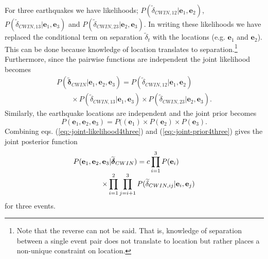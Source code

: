 \documentclass[extra]{gji}
\begin{document}
For three earthquakes we have likelihoods;
$P(\widetilde{\delta}_{CWIN,12}|\mathbf{e}_1, \mathbf{e}_2)$,
$P(\widetilde{\delta}_{CWIN,13}|\mathbf{e}_1, \mathbf{e}_3)$
and
$P(\widetilde{\delta}_{CWIN,23}|\mathbf{e}_2, \mathbf{e}_3)$.
In writing
these likelihoods we have replaced the conditional term on separation
$\widetilde{\delta}_t$ with the locations (e.g. $\mathbf{e}_1$ and $\mathbf{e}_2$).
This can be done because
knowledge of location translates to separation.\footnote{Note that the reverse
can not be said. That is, knowledge of separation between a single event pair
does not translate to location but rather places a non-unique constraint on
location.}
Furthermore, since the pairwise functions are independent the joint
likelihood becomes
\begin{equation}
\begin{array}{l}
\label{eq:-joint-likelihood4three}
P(\widetilde{\mathbf{\delta}}_{CWIN} | \mathbf{e}_1, \mathbf{e}_2, \mathbf{e}_3) =
P(\widetilde{\delta}_{CWIN,12} | \mathbf{e}_1, \mathbf{e}_2) \\
\hspace{2em} \times P(\widetilde{\delta}_{CWIN,13} | \mathbf{e}_1, \mathbf{e}_3)
\times  P(\widetilde{\delta}_{CWIN,23} | \mathbf{e}_2, \mathbf{e}_3).
\end{array}
\end{equation}
Similarly, the earthquake locations are independent and the
joint prior becomes
\begin{equation}
\label{eq:-joint-prior4three}
P(\mathbf{e}_1, \mathbf{e}_2, \mathbf{e}_3) = P((\mathbf{e}_1) \times P(\mathbf{e}_2) \times P(\mathbf{e}_3).
\end{equation}
Combining eqs. (\ref{eq:-joint-likelihood4three}) and (\ref{eq:-joint-prior4three})
gives the joint posterior function
\begin{equation}
\label{eq-3eqposterior}
\begin{array}{l}
P(\mathbf{e}_1, \mathbf{e}_2, \mathbf{e}_3 | \widetilde{\mitbf{\delta}}_{CWIN}) = c \displaystyle \prod_{i=1}^3 P(\mathbf{e}_i) \\
\hspace{4em}  \times \displaystyle \prod_{i=1}^2 \prod_{j=i+1}^3 P(\widetilde{\delta}_{CWIN,ij}|\mathbf{e}_i,\mathbf{e}_j)
\end{array}
\end{equation}
for three events.
\end{document}
